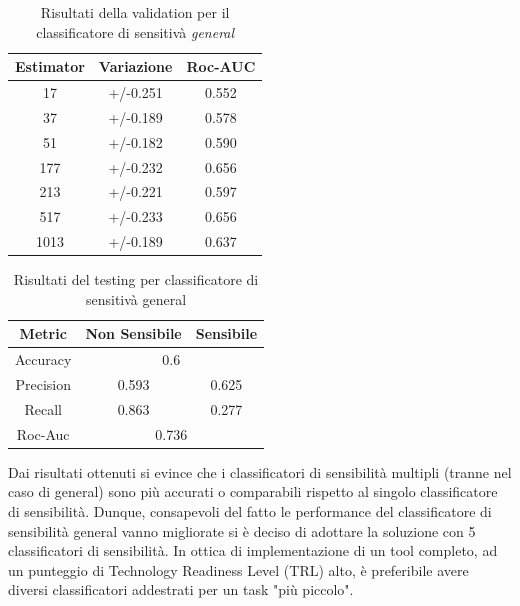 \begin{table}[h]

\centering
\begin{tabular}{|c|c|c|}
\hline
\textbf{Estimator} & \textbf{Variazione} & \textbf{Roc-AUC} \\ \hline
17 & +/-0.251 & 0.552 \\ \hline
37 & +/-0.189 & 0.578 \\ \hline
51 & +/-0.182 & 0.590 \\ \hline
177 & +/-0.232 & 0.656 \\ \hline
213 & +/-0.221 & 0.597 \\ \hline
517 & +/-0.233 & 0.656 \\ \hline
1013 & +/-0.189 & 0.637 \\ \hline
\end{tabular}
\caption{Risultati della validation per il classificatore di sensitivà \textit{general}}
\label{tbl:val_sens_general}
\end{table}
\FloatBarrier

\begin{table}[h]

\centering
\begin{tabular}{|c|c|c|}
\hline
\textbf{Metric} & \textbf{Non Sensibile} & \textbf{Sensibile} \\ \hline
Accuracy & \multicolumn{2}{c|}{0.6} \\ \hline
Precision & 0.593 & 0.625 \\ \hline
Recall & 0.863 & 0.277 \\ \hline
Roc-Auc & \multicolumn{2}{c|}{0.736} \\ \hline
\end{tabular}
\caption{Risultati del testing per classificatore di sensitivà general}
\label{tbl:training_sens_general}
\end{table}
\FloatBarrier


Dai risultati ottenuti si evince che i classificatori di sensibilità multipli (tranne nel caso di general) sono più accurati o comparabili rispetto al singolo classificatore di sensibilità. Dunque, consapevoli del fatto le performance del classificatore di sensibilità general vanno migliorate si è deciso di adottare la soluzione con 5 classificatori di sensibilità. In ottica di implementazione di un tool completo, ad un punteggio di Technology Readiness Level (TRL) alto, è preferibile avere diversi classificatori addestrati per un task "più piccolo".

